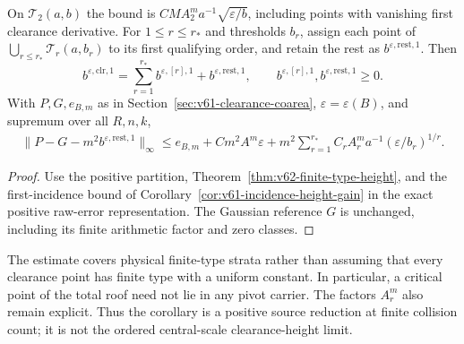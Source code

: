 \begin{corollary}
\label{cor:v62-fold-clearance}
On $\mathcal T_2(a,b)$ the bound is
$CMA_2^m a^{-1}\sqrt{\varepsilon/b}$, including points with vanishing
first clearance derivative. For $1\le r\le r_*$ and thresholds $b_r$,
assign each point of $\bigcup_{r\le r_*}\mathcal T_r(a,b_r)$ to its
first qualifying order, and retain the rest as
$b^{\varepsilon,\mathrm{rest},1}$. Then
\[
 b^{\varepsilon,\mathrm{clr},1}
    =\sum_{r=1}^{r_*}b^{\varepsilon,[r],1}
                         +b^{\varepsilon,\mathrm{rest},1},
       \qquad b^{\varepsilon,[r],1},b^{\varepsilon,\mathrm{rest},1}\ge0.
\]
With $P,G,e_{B,m}$ as in Section~\ref{sec:v61-clearance-coarea},
$\varepsilon=\varepsilon(B)$, and supremum over all $R,n,k$,
\begin{align}\label{eq:v62-finite-type-error}
 \|P-G-m^2b^{\varepsilon,\mathrm{rest},1}\|_\infty
 \le e_{B,m}+Cm^2A^m\varepsilon
       +m^2\sum_{r=1}^{r_*}C_rA_r^m a^{-1}(\varepsilon/b_r)^{1/r}.
\end{align}
\end{corollary}
\begin{proof}
Use the positive partition, Theorem~\ref{thm:v62-finite-type-height},
and the first-incidence bound of
Corollary~\ref{cor:v61-incidence-height-gain} in the exact positive
raw-error representation. The Gaussian reference $G$ is unchanged,
including its finite arithmetic factor and zero classes.
\end{proof}

The estimate covers physical finite-type strata rather than assuming
that every clearance point has finite type with a uniform constant.
In particular, a critical point of the total roof need not lie in any
pivot carrier. The factors $A_r^m$ also remain explicit. Thus the
corollary is a positive source reduction at finite collision count;
it is not the ordered central-scale clearance-height limit.
